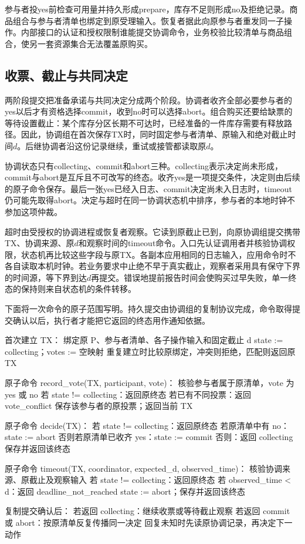参与者投yes前检查可用量并持久形成prepare，库存不足则形成no及拒绝记录。商品组合与参与者清单也绑定到原受理输入。恢复者据此向原参与者重发同一子操作。内部接口的认证和授权限制谁能提交协调命令，业务校验比较清单与商品组合，使另一套资源集合无法覆盖原购买。

\subsection{收票、截止与共同决定}

两阶段提交把准备承诺与共同决定分成两个阶段。协调者收齐全部必要参与者的yes以后才有资格选择commit，收到no时可以选择abort。组合购买还要给缺票的等待设置截止：某个库存分区长期不可达时，已经准备的一件库存需要有释放路径。因此，协调组在首次保存TX时，同时固定参与者清单、原输入和绝对截止时间$d$。后继协调者沿这份记录继续，重试或接管都读取原$d$。

协调状态只有collecting、commit和abort三种。collecting表示决定尚未形成，commit与abort是互斥且不可改写的终态。收齐yes是一项提交条件，决定则由后续的原子命令保存。最后一张yes已经入日志、commit决定尚未入日志时，timeout仍可能先取得abort。决定与超时在同一协调状态机中排序，参与者的本地时钟不参加这项仲裁。

超时由受授权的协调进程或恢复者观察。它读到原截止已到，向原协调组提交携带TX、协调来源、原$d$和观察时间的timeout命令。入口先认证调用者并核验协调权限，状态机再比较这些字段与原TX。各副本应用相同的日志输入，应用命令时不各自读取本机时钟。若业务要求中止绝不早于真实截止，观察者采用具有保守下界的时间源，等下界到达$d$再提交。错误地提前报告时间会使购买过早失败，单一终态的保持则来自状态机的条件转移。

下面将一次命令的原子范围写明。持久提交由协调组的复制协议完成，命令取得提交确认以后，执行者才能把它返回的终态用作通知依据。

\begin{BookCode}
首次建立 TX：
    绑定原 P、参与者清单、各子操作输入和固定截止 d
    state := collecting；votes := 空映射
    重复建立时比较原绑定，冲突则拒绝，匹配则返回原 TX

原子命令 record_vote(TX, participant, vote)：
    核验参与者属于原清单，vote 为 yes 或 no
    若 state != collecting：返回原终态
    若已有不同投票：返回 vote_conflict
    保存该参与者的原投票；返回当前 TX

原子命令 decide(TX)：
    若 state != collecting：返回原终态
    若原清单中有 no：state := abort
    否则若原清单已收齐 yes：state := commit
    否则：返回 collecting
    保存并返回该终态

原子命令 timeout(TX, coordinator, expected_d, observed_time)：
    核验协调来源、原截止及观察输入
    若 state != collecting：返回原终态
    若 observed_time < d：返回 deadline_not_reached
    state := abort；保存并返回该终态

复制提交确认后：
    若返回 collecting：继续收票或等待截止观察
    若返回 commit 或 abort：按原清单反复传播同一决定
    回复未知时先读原协调记录，再决定下一动作
\end{BookCode}

